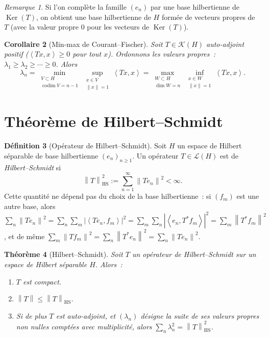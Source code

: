 \documentclass[a4paper,12pt]{book}
\DeclareMathOperator{\Ker}{Ker}
\DeclareMathOperator{\codim}{codim}
\newcommand{\norm}[1]{\left\| #1 \right\|}
\newcommand{\abs}[1]{\left| #1 \right|}
\newcommand{\inner}[2]{\left\langle #1, #2 \right\rangle}
\theoremstyle{definition}
\newtheorem{definition}{Définition}[chapter]
\theoremstyle{plain}
\newtheorem{theoreme}[definition]{Théorème}
\newtheorem{corollaire}[definition]{Corollaire}
\theoremstyle{remark}
\newtheorem{remarque}[definition]{Remarque}
\begin{document}
\begin{remarque}
\label{rem:base-hilbertienne-vp}
Si l'on complète la famille $(e_n)$ par une base hilbertienne de $\Ker(T)$, on obtient
une base hilbertienne de $H$ formée de vecteurs propres de $T$ (avec la valeur propre $0$
pour les vecteurs de $\Ker(T)$).
\end{remarque}

\begin{corollaire}[Min-max de Courant--Fischer]
\label{cor:courant-fischer}
Soit $T \in \mathcal{K}(H)$ auto-adjoint positif ($\inner{Tx}{x} \ge 0$ pour tout $x$).
Ordonnons les valeurs propres~: $\lambda_1 \ge \lambda_2 \ge \cdots \ge 0$. Alors
\[
  \lambda_n = \min_{\substack{V \subset H \\ \codim V = n-1}}
    \sup_{\substack{x \in V \\ \norm{x} = 1}} \inner{Tx}{x}
  = \max_{\substack{W \subset H \\ \dim W = n}}
    \inf_{\substack{x \in W \\ \norm{x} = 1}} \inner{Tx}{x}.
\]
\end{corollaire}

\section{Théorème de Hilbert--Schmidt}

\begin{definition}[Opérateur de Hilbert--Schmidt]
\label{def:hilbert-schmidt}
Soit $H$ un espace de Hilbert séparable de base hilbertienne $(e_n)_{n \ge 1}$. Un
opérateur $T \in \mathcal{L}(H)$ est de \emph{Hilbert--Schmidt} si
\[
  \norm{T}_{\mathrm{HS}}^2 := \sum_{n=1}^\infty \norm{Te_n}^2 < \infty.
\]
Cette quantité ne dépend pas du choix de la base hilbertienne~: si $(f_m)$ est une autre
base, alors $\sum_n \norm{Te_n}^2 = \sum_n \sum_m \abs{\inner{Te_n}{f_m}}^2
= \sum_m \sum_n \abs{\inner{e_n}{T^*f_m}}^2 = \sum_m \norm{T^*f_m}^2$, et de même
$\sum_m \norm{Tf_m}^2 = \sum_n \norm{T^*e_n}^2 = \sum_n \norm{Te_n}^2$.
\end{definition}

\begin{theoreme}[Hilbert--Schmidt]
\label{thm:hilbert-schmidt}
Soit $T$ un opérateur de Hilbert--Schmidt sur un espace de Hilbert séparable $H$. Alors~:
\begin{enumerate}[label=(\roman*)]
  \item $T$ est compact.
  \item $\norm{T} \le \norm{T}_{\mathrm{HS}}$.
  \item Si de plus $T$ est auto-adjoint, et $(\lambda_n)$ désigne la suite de ses valeurs
        propres non nulles comptées avec multiplicité, alors
        $\sum_n \lambda_n^2 = \norm{T}_{\mathrm{HS}}^2$.
\end{enumerate}
\end{theoreme}
\end{document}
